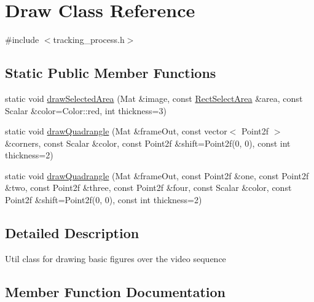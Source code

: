 \hypertarget{class_draw}{}\section{Draw Class Reference}
\label{class_draw}


{\ttfamily \#include $<$tracking\+\_\+process.\+h$>$}

\subsection*{Static Public Member Functions}
\begin{DoxyCompactItemize}
\item 
static void \hyperlink{class_draw_a54a8d0e7bb55b04a043a4826cce7597c}{draw\+Selected\+Area} (Mat \&image, const \hyperlink{class_rect_select_area}{Rect\+Select\+Area} \&area, const Scalar \&color=Color\+::red, int thickness=3)
\item 
static void \hyperlink{class_draw_ae913dc8558c01a647d0ea13508a64d36}{draw\+Quadrangle} (Mat \&frame\+Out, const vector$<$ Point2f $>$ \&corners, const Scalar \&color, const Point2f \&shift=Point2f(0, 0), const int thickness=2)
\item 
static void \hyperlink{class_draw_ad625910a7a637a54503985c91b893680}{draw\+Quadrangle} (Mat \&frame\+Out, const Point2f \&one, const Point2f \&two, const Point2f \&three, const Point2f \&four, const Scalar \&color, const Point2f \&shift=Point2f(0, 0), const int thickness=2)
\end{DoxyCompactItemize}


\subsection{Detailed Description}
Util class for drawing basic figures over the video sequence 

\subsection{Member Function Documentation}
